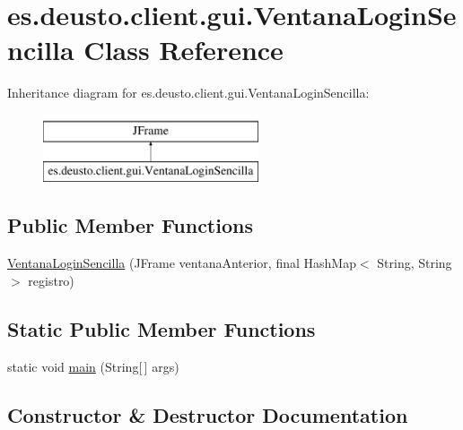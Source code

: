 \hypertarget{classes_1_1deusto_1_1client_1_1gui_1_1_ventana_login_sencilla}{}\section{es.\+deusto.\+client.\+gui.\+Ventana\+Login\+Sencilla Class Reference}
\label{classes_1_1deusto_1_1client_1_1gui_1_1_ventana_login_sencilla}
Inheritance diagram for es.\+deusto.\+client.\+gui.\+Ventana\+Login\+Sencilla\+:\begin{figure}[H]
\begin{center}
\leavevmode
\includegraphics[height=2.000000cm]{classes_1_1deusto_1_1client_1_1gui_1_1_ventana_login_sencilla}
\end{center}
\end{figure}
\subsection*{Public Member Functions}
\begin{DoxyCompactItemize}
\item 
\mbox{\hyperlink{classes_1_1deusto_1_1client_1_1gui_1_1_ventana_login_sencilla_ad7b99acd2cd24649522b88b5920e95ef}{Ventana\+Login\+Sencilla}} (J\+Frame ventana\+Anterior, final Hash\+Map$<$ String, String $>$ registro)
\end{DoxyCompactItemize}
\subsection*{Static Public Member Functions}
\begin{DoxyCompactItemize}
\item 
static void \mbox{\hyperlink{classes_1_1deusto_1_1client_1_1gui_1_1_ventana_login_sencilla_aed8d00c2588c75b104e152fe4048413d}{main}} (String\mbox{[}$\,$\mbox{]} args)
\end{DoxyCompactItemize}


\subsection{Constructor \& Destructor Documentation}
\mbox{\label{classes_1_1deusto_1_1client_1_1gui_1_1_ventana_login_sencilla_ad7b99acd2cd24649522b88b5920e95ef}} 
